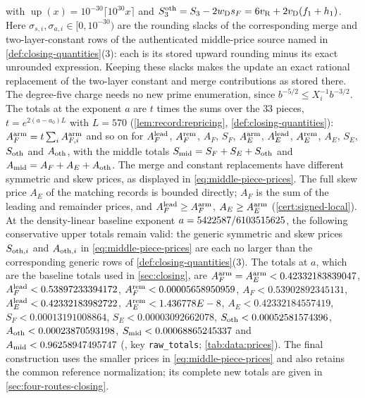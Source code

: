 with $\operatorname{up}(x)=10^{-30}\lceil10^{30}x\rceil$ and
$S^{\rm oth}_3=S_3-2w_{\rm D}s_F=6v_{\rm R}+2v_{\rm D}(f_1+h_1)$.
Here $\sigma_{s,i},\sigma_{a,i}\in[0,10^{-30})$ are the rounding
slacks of the corresponding merge and two-layer-constant rows of
the authenticated middle-price source named in
\cref{def:closing-quantities}(3): each is its stored upward
rounding minus its exact unrounded expression. Keeping these
slacks makes the update an exact rational replacement of the
two-layer constant and merge contributions as stored there. The degree-five charge needs no new prime enumeration,
since $b^{-5/2}\le X_i^{-1}b^{-3/2}$.
The totals at the exponent $a$ are $t$ times the sums over the $33$ pieces,
$t=e^{2(a-a_0)L}$ with $L=570$ (\cref{lem:record:repricing},
\cref{def:closing-quantities}): $A^{\rm arm}_F=t\sum_iA^{\rm arm}_{F,i}$ and so on for
$A^{\rm lead}_F$, $A^{\rm rem}_F$, $A_F$, $S_F$, $A^{\rm arm}_E$, $A^{\rm lead}_E$,
$A^{\rm rem}_E$, $A_E$, $S_E$, $S_{\rm oth}$ and $A_{\rm oth}$, with the middle totals
$S_{\rm mid}=S_F+S_E+S_{\rm oth}$ and $A_{\rm mid}=A_F+A_E+A_{\rm oth}$. The merge and constant replacements have different symmetric and skew
prices, as displayed in \eqref{eq:middle-piece-prices}. The full skew
price $A_E$ of the matching records is bounded directly; $A_F$ is the sum of the
leading and remainder prices, and $A^{\rm lead}_F\ge A^{\rm arm}_F$,
$A_E\ge A^{\rm arm}_E$ (\cref{cert:signed-local}). At the density-linear
baseline exponent $a=5422587/6103515625$, the following conservative upper totals
remain valid: the generic symmetric and skew prices
$S_{{\rm oth},i}$ and $A_{{\rm oth},i}$ in \eqref{eq:middle-piece-prices} are each no larger than the corresponding generic rows of
\cref{def:closing-quantities}(3). The totals at $a$, which are the
baseline totals used in \cref{sec:closing}, are
$A^{\rm arm}_F=A^{\rm arm}_E<0.42332183839047$,
$A^{\rm lead}_F<0.53897233394172$,
$A^{\rm rem}_F<0.00005658950959$,
$A_F<0.53902892345131$,
$A^{\rm lead}_E<0.42332183982722$,
$A^{\rm rem}_E<1.436778E-8$,
$A_E<0.42332184557419$,
$S_F<0.00013191008864$,
$S_E<0.00003092662078$,
$S_{\rm oth}<0.00052581574396$,
$A_{\rm oth}<0.00023870593198$,
$S_{\rm mid}<0.00068865245337$ and
$A_{\rm mid}<0.96258947495747$
(, key
\texttt{raw\_totals}; \cref{tab:data:prices}). The final construction
uses the smaller prices in \eqref{eq:middle-piece-prices} and also
retains the common reference normalization; its complete new totals
are given in \cref{sec:four-routes-closing}.

